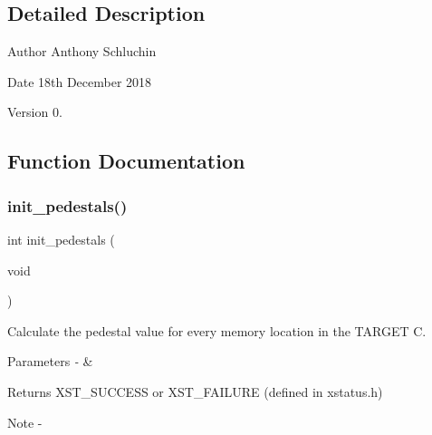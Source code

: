 \subsection{Detailed Description}
\begin{DoxyAuthor}{Author}
Anthony Schluchin 
\end{DoxyAuthor}
\begin{DoxyDate}{Date}
18th December 2018 
\end{DoxyDate}
\begin{DoxyVersion}{Version}
0. 
\end{DoxyVersion}


\subsection{Function Documentation}
\mbox{\label{pedestal_8c_a929a976b9db373b2e82d86027463c49a}} 
\subsubsection{init\_pedestals()}
{\footnotesize\ttfamily int init\+\_\+pedestals (\begin{DoxyParamCaption}\item[{void}]{ }\end{DoxyParamCaption})}



Calculate the pedestal value for every memory location in the T\+A\+R\+G\+ET C. 


\begin{DoxyParams}{Parameters}
{\em -\/} & \\
\hline
\end{DoxyParams}
\begin{DoxyReturn}{Returns}
X\+S\+T\+\_\+\+S\+U\+C\+C\+E\+SS or X\+S\+T\+\_\+\+F\+A\+I\+L\+U\+RE (defined in xstatus.\+h)
\end{DoxyReturn}
\begin{DoxyNote}{Note}
-\/ 
\end{DoxyNote}
